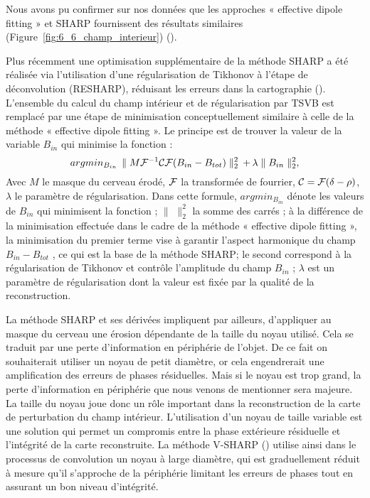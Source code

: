 {Nous avons pu confirmer sur nos données que les approches « effective dipole fitting » et
SHARP fournissent des résultats similaires (Figure~\ref{fig:6_6_champ_interieur}) (\cite{Schweser2011}).

Plus récemment une optimisation supplémentaire de la méthode SHARP a été réalisée via
l’utilisation d’une régularisation de Tikhonov à l’étape de déconvolution (RESHARP), réduisant les
erreurs dans la cartographie (\cite{Sun2014}). L’ensemble du calcul du champ intérieur et de régularisation par
TSVB est remplacé par une étape de minimisation conceptuellement similaire à celle de la méthode
« effective dipole fitting ». Le principe est de trouver la valeur de la variable $B_{in}$ qui minimise la
fonction :
\begin{equation}
argmin_{B_{in}}\,\parallel M{\cal F}^{-1}{\cal C}{\cal F}(B_{in}-B_{tot})\parallel_2^2\,+\,\lambda\parallel B_{in}\parallel_2^2,
\end{equation}
Avec $M$ le masque du cerveau érodé, ${\cal F}$ la transformée de fourrier, ${\cal C} = {\cal F}(\delta-\rho)$, $\lambda$ le paramètre de
régularisation. Dans cette formule, $argmin_{B_{in}}$ dénote les valeurs de $B_{in}$ qui minimisent la fonction ; $\parallel\,\,\parallel_2^2$ la somme des carrés ; à la différence de la minimisation effectuée dans le cadre de la méthode « effective dipole fitting », la minimisation du premier terme vise à garantir l’aspect harmonique du
champ $B_{in}-B_{tot}$ , ce qui est la base de la méthode SHARP; le second correspond à la régularisation
de Tikhonov et contrôle l’amplitude du champ $B_{in}$ ; $\lambda$ est un paramètre de régularisation dont la valeur
est fixée par la qualité de la reconstruction.

La méthode SHARP et ses dérivées impliquent par ailleurs, d’appliquer au masque du cerveau
une érosion dépendante de la taille du noyau utilisé. Cela se traduit par une perte d’information en
périphérie de l’objet. De ce fait on souhaiterait utiliser un noyau de petit diamètre, or cela engendrerait
une amplification des erreurs de phases résiduelles. Mais si le noyau est trop grand, la perte
d’information en périphérie que nous venons de mentionner sera majeure. La taille du noyau joue
donc un rôle important dans la reconstruction de la carte de perturbation du champ intérieur.
L’utilisation d’un noyau de taille variable est une solution qui permet un compromis entre la phase
extérieure résiduelle et l’intégrité de la carte reconstruite. La méthode V-SHARP (\cite{Wu2012}) utilise ainsi dans
le processus de convolution un noyau à large diamètre, qui est graduellement réduit à mesure qu’il
s’approche de la périphérie limitant les erreurs de phases tout en assurant un bon niveau d’intégrité.
}

